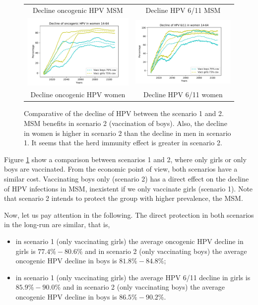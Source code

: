 \begin{figure}[!]
\begin{tabular}{cc}
		Decline oncogenic HPV MSM	& Decline HPV 6/11 MSM \\ 
		\includegraphics[width=0.5\linewidth]{IMGs/10.-Coste_efectividad/solo_hom_y_solo_muj/onco_muj.pdf}	& 
		\includegraphics[width=0.5\linewidth]{IMGs/10.-Coste_efectividad/solo_hom_y_solo_muj/verr_muj.pdf}  \\ 
		Decline oncogenic HPV women	& Decline HPV 6/11 women \\ 
	\end{tabular} 
	\caption{Comparative of the decline of HPV between the scenario 1 and 2. MSM benefits in scenario 2 (vaccination of boys). Also, the decline in women is higher in scenario 2 than the decline in men in scenario 1. It seems that the herd immunity effect is greater in scenario 2.}
	\label{fig:compara_1_1}
\end{figure}

Figure \ref{fig:compara_1_1} show a comparison between scenarios 1 and 2, where only girls or only boys are vaccinated. From the economic point of view, both scenarios have a similar cost. Vaccinating boys only (scenario 2) has a direct effect on the decline of HPV infections in MSM, inexistent if we only vaccinate girls (scenario 1). Note that scenario 2 intends to protect the group with higher prevalence, the MSM. 

Now, let us pay attention in the following. The direct protection in both scenarios in the long-run are similar, that is, 

\begin{itemize}
\item in scenario 1 (only vaccinating girls) the average oncogenic HPV decline in girls is $77.4\%-80.6\%$ and in scenario 2 (only vaccinating boys) the average oncogenic HPV decline in boys is $81.8\%-84.8\%$;
\item in scenario 1 (only vaccinating girls) the average HPV 6/11 decline in girls is $85.9\%-90.0\%$ and in scenario 2 (only vaccinating boys) the average oncogenic HPV decline in boys is $86.5\%-90.2\%$.
\end{itemize}

